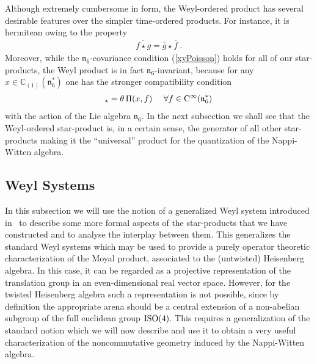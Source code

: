 \documentclass[11pt,a4paper]{article}
\def\CC{{\rm C}}
\def\mfn{{\mathfrak n}}
\newcommand{\complex}{{\mathbb C}} %
\newcommand{\beq}{\begin{eqnarray}}
\newcommand{\eeq}{\end{eqnarray}}
\begin{document}
Although extremely cumbersome in form, the Weyl-ordered product has
several desirable features over the simpler time-ordered products. For
instance, it is hermitean owing to the property
\beq
\overline{f\star g}=\overline{g}\star\overline{f} \ .
\label{Weylstarherm}\eeq
Moreover, while the $\mfn_6$-covariance condition (\ref{xyPoisson})
holds for all of our star-products, the Weyl product is in fact
$\mfn_6$-invariant, because for any $x\in\complex_{(1)}(\mfn_6^*)$ one
has the stronger compatibility condition
\beq
[x,f]_\star=\theta\,\Pi(x,f) ~~~~ \forall f\in\CC^\infty(\mfn_6^*)
\label{strongcompcond}\eeq
with the action of the Lie algebra $\mfn_6$. In the next
subsection we shall see that the Weyl-ordered star-product is, in a
certain sense, the generator of all other star-products making it the
``universal'' product for the quantization of the Nappi-Witten
algebra.

\subsection{Weyl Systems\label{WeylSystems}}

In this subsection we will use the notion of a generalized Weyl system
introduced in~\cite{ALZ1} to describe some more formal aspects of the
star-products that we have constructed and to analyse the interplay
between them. This generalizes the standard Weyl systems which may be
used to provide a purely operator theoretic characterization of the
Moyal product, associated to the (untwisted) Heisenberg algebra. In
this case, it can be regarded as a projective representation of the
translation group in an even-dimensional real vector space. However,
for the twisted Heisenberg algebra such a representation is not
possible, since by definition the appropriate arena should be a
central extension of a non-abelian subgroup of the full euclidean
group ${\rm ISO}(4)$. This requires a generalization of the standard
notion which we will now describe and use it to obtain a very useful
characterization of the noncommutative geometry induced by the
Nappi-Witten algebra.
\end{document}
